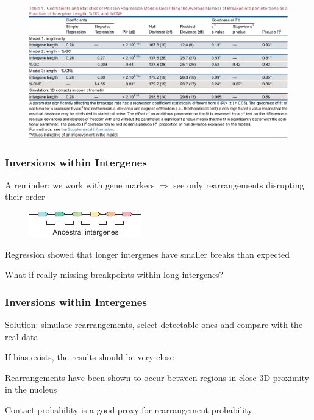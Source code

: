 \documentclass[svgnames,14pt]{beamer}
\begin{document}
\begin{frame}
\begin{figure}
	\centering
	\includegraphics[scale = .67]{Table11.pdf}
\end{figure}
\end{frame}

\begin{frame}
\frametitle{Inversions within Intergenes}
A reminder: we work with gene markers $\Rightarrow$ see only rearrangements disrupting their order
\begin{figure}
	\centering
	\includegraphics[scale = 2.20]{Intergenes.pdf}
\end{figure}
\vspace{12pt}
Regression showed that longer intergenes have smaller breaks than expected

\vspace{12pt}
What if really missing breakpoints within long intergenes?
\end{frame}

\begin{frame}
\frametitle{Inversions within Intergenes}
Solution: simulate rearrangements, select detectable ones and compare with the real data

\vspace{12pt}
If bias exists, the results should be very close

\vspace{12pt}
Rearrangements have been shown to occur between regions in close 3D proximity in the nucleus

\vspace{12pt}
Contact probability is a good proxy for rearrangement probability
\end{frame}
\end{document}
